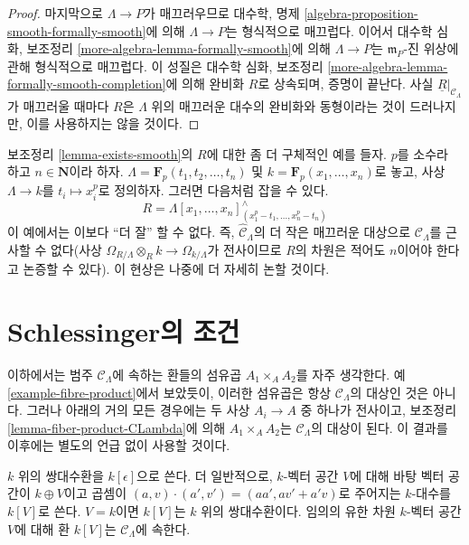 \begin{proof}
\medskip\noindent
마지막으로 $\Lambda \to P$가 매끄러우므로 대수학, 명제
\ref{algebra-proposition-smooth-formally-smooth}에 의해
$\Lambda \to P$는 형식적으로 매끄럽다. 이어서 대수학 심화, 보조정리
\ref{more-algebra-lemma-formally-smooth}에 의해 $\Lambda \to P$는
$\mathfrak m_P$-진 위상에 관해 형식적으로 매끄럽다. 이 성질은 대수학
심화, 보조정리 \ref{more-algebra-lemma-formally-smooth-completion}에 의해
완비화 $R$로 상속되며, 증명이 끝난다. 사실
$\underline{R}|_{\mathcal{C}_\Lambda}$가 매끄러울 때마다 $R$은
$\Lambda$ 위의 매끄러운 대수의 완비화와 동형이라는 것이 드러나지만,
이를 사용하지는 않을 것이다.
\end{proof}

\begin{example}
\label{example-smooth-explicit}
보조정리 \ref{lemma-exists-smooth}의 $R$에 대한 좀 더 구체적인 예를
들자. $p$를 소수라 하고 $n \in \mathbf{N}$이라 하자.
$\Lambda = \mathbf{F}_p(t_1, t_2, \ldots, t_n)$ 및
$k = \mathbf{F}_p(x_1, \ldots, x_n)$로 놓고, 사상
$\Lambda \to k$를 $t_i \mapsto x_i^p$로 정의하자. 그러면 다음처럼
잡을 수 있다.
$$
R = \Lambda[x_1, \ldots, x_n]^\wedge_{(x_1^p - t_1, \ldots, x_n^p - t_n)}
$$
이 예에서는 이보다 ``더 잘'' 할 수 없다. 즉,
$\widehat{\mathcal{C}}_\Lambda$의 더 작은 매끄러운 대상으로
$\mathcal{C}_\Lambda$를 근사할 수 없다(사상
$\Omega_{R/\Lambda} \otimes_R k \to \Omega_{k/\Lambda}$가
전사이므로 $R$의 차원은 적어도 $n$이어야 한다고 논증할 수 있다).
이 현상은 나중에 더 자세히 논할 것이다.
\end{example}

\section{Schlessinger의 조건}
\label{section-schlessinger-conditions}

\noindent
이하에서는 범주 $\mathcal{C}_\Lambda$에 속하는 환들의 섬유곱
$A_1 \times_A A_2$를 자주 생각한다. 예
\ref{example-fibre-product}에서 보았듯이, 이러한 섬유곱은
항상 $\mathcal{C}_\Lambda$의 대상인 것은 아니다. 그러나 아래의
거의 모든 경우에는 두 사상 $A_i \to A$ 중 하나가 전사이고,
보조정리 \ref{lemma-fiber-product-CLambda}에 의해
$A_1 \times_A A_2$는 $\mathcal{C}_\Lambda$의 대상이 된다.
이 결과를 이후에는 별도의 언급 없이 사용할 것이다.

\medskip\noindent
$k$ 위의 쌍대수환을 $k[\epsilon]$으로 쓴다. 더 일반적으로,
$k$-벡터 공간 $V$에 대해 바탕 벡터 공간이 $k \oplus V$이고
곱셈이 $(a, v) \cdot (a', v') = (aa', av' + a'v)$로 주어지는
$k$-대수를 $k[V]$로 쓴다. $V = k$이면 $k[V]$는 $k$ 위의
쌍대수환이다. 임의의 유한 차원 $k$-벡터 공간 $V$에 대해
환 $k[V]$는 $\mathcal{C}_\Lambda$에 속한다.

